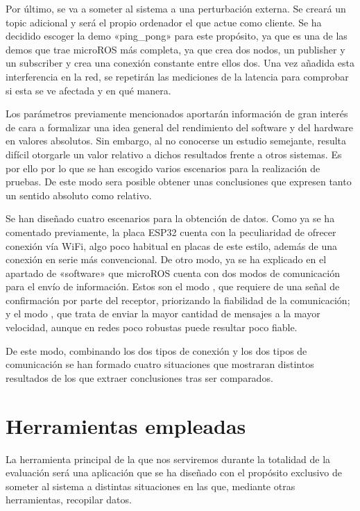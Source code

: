 \documentclass[a4paper,11pt,spanish]{sphinxmanual}
\begin{document}
\sphinxAtStartPar
Por último, se va a someter al sistema a una perturbación externa. Se creará
un topic adicional y será el propio ordenador el que actue como cliente. Se ha decidido
escoger la demo «ping\_pong» para este propósito, ya que es una de las demos que trae
micro\sphinxhyphen{}ROS más completa, ya que crea dos nodos, un publisher y un subscriber y crea
una conexión constante entre ellos dos. Una vez añadida esta interferencia en la red,
se repetirán las mediciones de la latencia para comprobar si esta se ve afectada y
en qué manera.

\sphinxAtStartPar
Los parámetros previamente mencionados aportarán información de gran interés de
cara a formalizar una idea general del rendimiento del software y del hardware
en valores absolutos. Sin embargo, al no conocerse un estudio semejante, resulta
difícil otorgarle un valor relativo a dichos resultados frente a otros sistemas.
Es por ello por lo que se han escogido varios escenarios para la realización de
pruebas. De este modo sera posible obtener unas conclusiones que expresen tanto
un sentido absoluto como relativo.

\sphinxAtStartPar
Se han diseñado cuatro escenarios para la obtención de datos. Como ya se ha comentado
previamente, la placa ESP32 cuenta con la peculiaridad de ofrecer conexión vía Wi\sphinxhyphen{}Fi,
algo poco habitual en placas de este estilo, además de una conexión en serie más
convencional. De otro modo, ya se ha explicado en el apartado de «software» que
micro\sphinxhyphen{}ROS cuenta con dos modos de comunicación para el envío de información.
Estos son el modo , que requiere de una señal de confirmación por parte
del receptor, priorizando la fiabilidad de la comunicación; y el modo ,
que trata de enviar la mayor cantidad de mensajes a la mayor velocidad, aunque en
redes poco robustas puede resultar poco fiable.

\sphinxAtStartPar
De este modo, combinando los dos tipos de conexión y los dos tipos de comunicación
se han formado cuatro situaciones que mostraran distintos resultados de los que
extraer conclusiones tras ser comparados.


\section{Herramientas empleadas}
\label{\detokenize{dise_xf1o_del_analisis:herramientas-empleadas}}
\sphinxAtStartPar
La herramienta principal de la que nos serviremos durante la totalidad de la
evaluación será una aplicación que se ha diseñado con el propósito exclusivo
de someter al sistema a distintas situaciones en las que, mediante otras
herramientas, recopilar datos.
\end{document}
